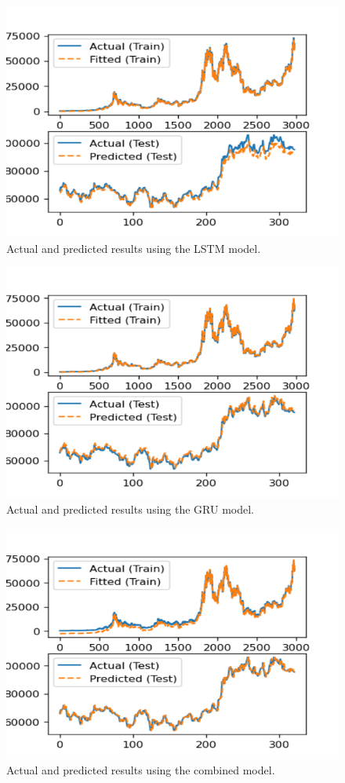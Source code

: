 \documentclass[]{interact}
\theoremstyle{plain}%
\theoremstyle{definition}
\theoremstyle{remark}
\begin{document}
\begin{figure}[H]

{\centering \includegraphics[width=0.8\linewidth]{LSTM1} 

}

\caption{Actual and predicted results using the LSTM model.}\label{fig:unnamed-chunk-3}
\end{figure}

\begin{figure}[H]

{\centering \includegraphics[width=0.8\linewidth]{GRU1} 

}

\caption{Actual and predicted results using the GRU model.}\label{fig:unnamed-chunk-4}
\end{figure}

\begin{figure}[H]

{\centering \includegraphics[width=0.8\linewidth]{Comb} 

}

\caption{Actual and predicted results using the combined model.}\label{fig:unnamed-chunk-5}
\end{figure}
\end{document}

